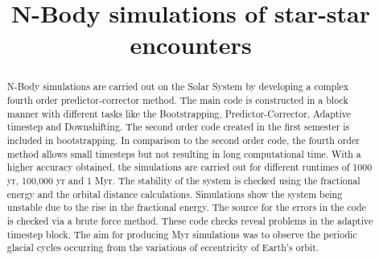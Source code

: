 \documentclass[11pt]{article}
\begin{document}
\date{}

\title{\bf N-Body simulations of star-star encounters}

\maketitle

\begin{abstract}
{\normalsize{ 
N-Body simulations are carried out on the Solar System by developing a complex fourth order predictor-corrector method. The main code is constructed in a block manner with different tasks like the Bootstrapping, Predictor-Corrector, Adaptive timestep and Downshifting. The second order code created in the first semester is included in bootstrapping. In comparison to the second order code, the fourth order method allows small timesteps but not resulting in long computational time. With a higher accuracy obtained, the simulations are carried out for different runtimes of 1000 yr, 100,000 yr and 1 Myr. The stability of the system is checked using the fractional energy and the orbital distance calculations. Simulations show the system being unstable due to the rise in the fractional energy. The source for the errors in the code is checked via a brute force method. These code checks reveal problems in the adaptive timestep block. The aim for producing Myr simulations was to observe the periodic glacial cycles occurring from the variations of eccentricity of Earth's orbit. 
 }}

\end{abstract}

\bigskip
\end{document}
